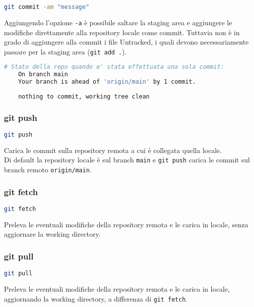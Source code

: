 \begin{lstlisting}[language=bash]
	git commit -am "message"
\end{lstlisting}
Aggiungendo l'opzione \texttt{-a} è possibile saltare la staging area e aggiungere le modifiche direttamente alla repository locale come commit. Tuttavia non è in grado di aggiungere alla commit i file Untracked, i quali devono necessariamente passare per la staging area (\texttt{git add .}).\\

\begin{lstlisting}[language=bash, backgroundcolor=\color{green!5}]
	# Stato della repo quando e' stata effettuata una sola commit: 
	On branch main
	Your branch is ahead of 'origin/main' by 1 commit.
	
	nothing to commit, working tree clean
\end{lstlisting}

\subsubsection{git push}
\begin{lstlisting}[language=bash]
	git push
\end{lstlisting}
Carica le commit sulla repository remota a cui è collegata quella locale.\\
Di default la repository locale è sul branch \texttt{main} e \texttt{git push} carica le commit sul branch remoto \texttt{origin/main}.

\subsubsection{git fetch}
\begin{lstlisting}[language=bash]
	git fetch
\end{lstlisting}
Preleva le eventuali modifiche della repository remota e le carica in locale, senza aggiornare la working directory.

\subsubsection{git pull}
\begin{lstlisting}[language=bash]
	git pull
\end{lstlisting}
Preleva le eventuali modifiche della repository remota e le carica in locale, aggiornando la working directory, a differenza di \texttt{git fetch}.\\



